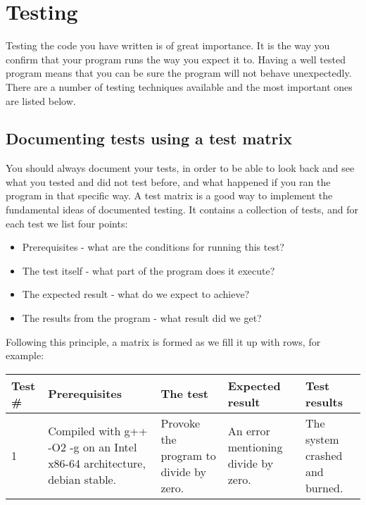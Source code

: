 \documentclass[11pt,a4paper,twoside]{article}
\begin{document}

\section{Testing}

Testing the code you have written is of great importance. It is the way you
confirm that your program runs the way you expect it to. Having a well tested
program means that you can be sure the program will not behave unexpectedly.
There are a number of testing techniques available and the most important ones
are listed below.


\subsection{Documenting tests using a test matrix}

You should always document your tests, in order to be able to look back and see
what you tested and did not test before, and what happened if you ran the
program in that specific way. A test matrix is a good way to implement the
fundamental ideas of documented testing. It contains a collection of tests, and
for each test we list four points:

\begin{itemize}
    \item Prerequisites - what are the conditions for running this test?
    \item The test itself - what part of the program does it execute?
    \item The expected result - what do we expect to achieve?
    \item The results from the program - what result did we get?
\end{itemize}

Following this principle, a matrix is formed as we fill it up with rows, for example:

\begin{center}
\begin{tabular}{|l|p{2.5cm}|p{2cm}|p{2.5cm}|p{2.5cm}|}
\hline
Test \# & Prerequisites & The test & Expected result & Test results \\ \hline 1
& Compiled with g++ -O2 -g on an Intel x86-64 architecture, debian stable. &
Provoke the program to divide by zero. & An error mentioning divide by zero. &
The system crashed and burned. \\
\hline
\end{tabular}
\end{center}
\end{document}
